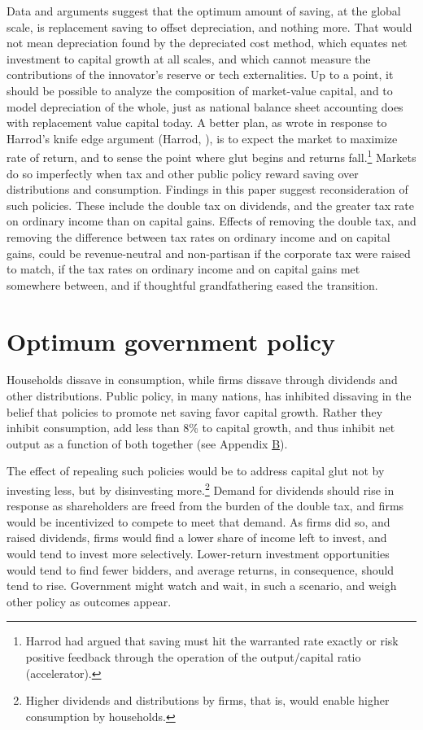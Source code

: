 \documentclass[a4padisinvitingper,fleqn]{latex_styles/cas-sc}
\begin{document}
Data and arguments suggest that the optimum amount of
saving, at the global scale, is replacement saving to offset depreciation, and nothing
more. That would not mean 
depreciation found by the depreciated cost method, which equates net investment to capital growth at all scales, and which cannot measure the contributions of the innovator's reserve or tech externalities.
Up to a point, it should be
possible to analyze the composition of market-value capital, and to model
depreciation of the whole,
just as national balance sheet accounting does with replacement value capital today.
A better plan, as
\citet{solowContributionTheoryEconomic1956a} wrote in response to
Harrod's knife edge argument (Harrod, \citeyear{harrodEssayDynamicTheory1939}), is to
expect the market to maximize rate of return, and to sense the point
where glut begins and returns fall.\footnote{Harrod had argued that
saving must hit the warranted rate exactly or risk positive
feedback through the operation of the output/capital ratio
(accelerator).}
%
Markets do so imperfectly when tax and other public policy reward
saving over distributions and consumption. Findings in this paper
suggest reconsideration of such policies. These include the double tax on
dividends, and the greater tax rate on ordinary income than on capital
gains. Effects of removing the double tax, and removing the difference
between tax rates on ordinary income and on capital gains, could be
revenue-neutral and non-partisan if the corporate tax were raised to
match, if the tax rates on ordinary income and on capital gains met
somewhere between, and if thoughtful grandfathering eased the
transition.

\section{Optimum government policy}

Households dissave in consumption, while firms dissave through dividends and other distributions.
Public policy, in many nations, has inhibited dissaving in the belief that policies to promote net saving favor capital growth.
Rather they inhibit consumption, add less than 8\% to capital growth, and thus inhibit net output as a function of both together (see Appendix \hyperref[appendix-b]{B}).

The effect of repealing such policies would be to address capital glut not by investing less, but by disinvesting more.\footnote{Higher dividends and distributions by firms, that is, would enable higher consumption by households.} 
Demand for dividends should rise in response as shareholders are freed from the burden of the double tax, and firms would be incentivized to compete to meet that demand. As firms did so, and raised dividends, firms would find a lower share of income left to invest, and would tend to invest more selectively. Lower-return investment opportunities would tend to find fewer bidders, and average returns, in consequence, should tend to rise. Government might watch and wait, in such a scenario, and weigh other policy as outcomes appear.
\end{document}
